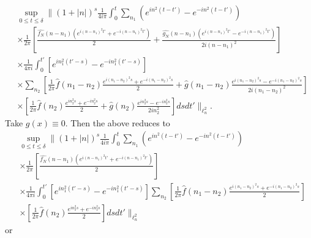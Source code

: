 \documentclass[12pt,reqno]{amsart}
\numberwithin{equation}{section}  %
\newcommand{\wh}{\widehat}
\begin{document}
\begin{equation*}
\begin{split}
& \sup_{0 \le t \le \delta} \| (1 + | n |)^{s} \frac{1}{4 i \pi} 
  \int_{0}^{t} \sum_{n_{1}} \left( e^{in^{2}(t-t')} - e^{-in^{2}(t-t')} \right)
  \\
  & \times \frac{1}{2 \pi} \left[ \frac{\wh{f_{N}}(n - n_{1})\left( e^{i(n - n_{1})^{2}t'} +
  e^{-i(n - n_{1})^{2}t'} \right)}{2} + \frac{\wh{g_{N}}(n - n_{1})\left(
  e^{i(n - n_{1})^{2}t'} - e^{-i(n - n_{1})^{2}t'}
  \right)}{2i(n - n_{1})^{2}} \right]
  \\
  & \times \frac{1}{4 \pi i} \int_{0}^{t'} \left[ e^{in_{1}^{2}(t' -s)} -
  e^{-in_{1}^{2}(t' -s)} \right]
  \\
  & \times \sum_{n_{2}} 
  \left[ \frac{1}{2 \pi} 
  \wh{f}(n_{1} - n_{2}) \frac{e^{i(n_{1} - n_{2})^{2}s} + e^{-i(n_{1} -
  n_{2})^{2}s}}{2} 
  + \wh{g}(n_{1} - n_{2})\frac{e^{i(n_{1} - n_{2})^{2}s} -
  e^{-i(n_{1} - n_{2})^{2}s}}{2 i (n_{1} - n_{2})^{2}} \right]
  \\
  & \times 
  \left[ \frac{1}{2 \pi} 
  \wh{f}(n_{2}) \frac{e^{in_{2}^{2}s} + e^{-in_{2}^{2}s}}{2} 
  + 
  \wh{g}(n_{2})\frac{e^{in_{2}^{2}s} - e^{-in_{2}^{2}s}}{2 i n_{2}^{2}} \right]
  ds dt'
  \|_{\ell^{2}_{n}}.
\end{split}
\end{equation*}
%
%
Take $g(x) \equiv 0$. Then the above reduces to
%
%
\begin{equation*}
\begin{split}
& \sup_{0 \le t \le \delta} \| (1 + | n |)^{s} \frac{1}{4 i \pi} 
  \int_{0}^{t} \sum_{n_{1}} \left( e^{in^{2}(t-t')} - e^{-in^{2}(t-t')} \right)
  \\
  & \times \frac{1}{2 \pi} \left[ \frac{\wh{f_{N}}(n - n_{1})\left( e^{i(n - n_{1})^{2}t'} +
  e^{-i(n - n_{1})^{2}t'} \right)}{2} \right]
  \\
  & \times \frac{1}{4 \pi i} \int_{0}^{t'} \left[ e^{in_{1}^{2}(t' -s)} -
  e^{-in_{1}^{2}(t' -s)} \right]
  \sum_{n_{2}} 
  \left[ \frac{1}{2 \pi} 
  \wh{f}(n_{1} - n_{2}) \frac{e^{i(n_{1} - n_{2})^{2}s} + e^{-i(n_{1} -
  n_{2})^{2}s}}{2} 
  \right]
  \\
  & \times 
  \left[ \frac{1}{2 \pi} 
  \wh{f}(n_{2}) \frac{e^{in_{2}^{2}s} + e^{-in_{2}^{2}s}}{2} 
  \right]
  ds dt'
  \|_{\ell^{2}_{n}}
\end{split}
\end{equation*}
%
or
\end{document}
